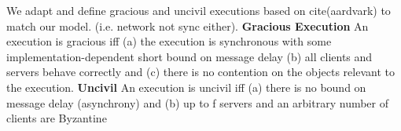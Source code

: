 { \iffalse
In fact, no leader-based system can guarantee Byzantine independence: a Byzantine leader may always inject conflicting operations that cause transactions to abort
\nc{we could use this example in a picture?}. Without additional network assumptions,
\sys{} also cannot enforce this property: for \sys{} to enforce Byzantine independence,a global adversary cannot have global control over the network (and thus fully determine message arrival order). We note that even with this stronger model, Byzantine independence is still unattainable for leader-based systems.
\fi
%
%
\iffalse
{}
We adapt and define gracious and uncivil executions based on cite(aardvark) to match our model. (i.e. network not sync either).
\textbf{Gracious Execution}
An execution is gracious iff (a) the execution is synchronous with some
implementation-dependent short bound on message delay (b) all clients and servers behave correctly and (c) there is no contention on the objects relevant to the execution.
\textbf{Uncivil}
An execution is uncivil iff (a) there is no bound on message delay (asynchrony) and (b) up to f servers and an arbitrary number of clients are Byzantine 



}

